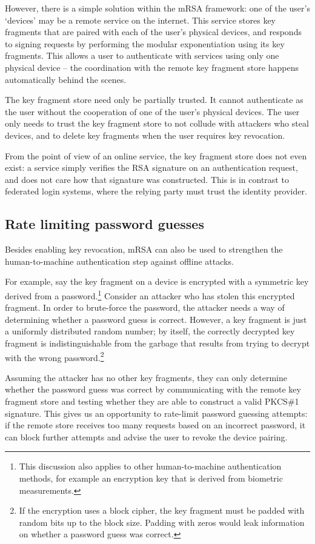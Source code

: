 However, there is a simple solution within the mRSA framework: one of the user's `devices' may be a
remote service on the internet. This service stores key fragments that are paired with each of the
user's physical devices, and responds to signing requests by performing the modular exponentiation
using its key fragments. This allows a user to authenticate with services using only one physical
device -- the coordination with the remote key fragment store happens automatically behind the
scenes.

The key fragment store need only be partially trusted. It cannot authenticate as the user without
the cooperation of one of the user's physical devices. The user only needs to trust the key fragment
store to not collude with attackers who steal devices, and to delete key fragments when the user
requires key revocation.

From the point of view of an online service, the key fragment store does not even exist: a service
simply verifies the RSA signature on an authentication request, and does not care how that signature
was constructed. This is in contrast to federated login systems, where the relying party must trust
the identity provider.

\subsection{Rate limiting password guesses}

Besides enabling key revocation, mRSA can also be used to strengthen the human-to-machine
authentication step against offline attacks.

For example, say the key fragment on a device is encrypted with a symmetric key derived from a
password.\footnote{This discussion also applies to other human-to-machine authentication methods,
for example an encryption key that is derived from biometric measurements.} Consider an attacker who
has stolen this encrypted fragment. In order to brute-force the password, the attacker needs a way
of determining whether a password guess is correct. However, a key fragment is just a uniformly
distributed random number; by itself, the correctly decrypted key fragment is indistinguishable from
the garbage that results from trying to decrypt with the wrong password.\footnote{If the encryption
uses a block cipher, the key fragment must be padded with random bits up to the block size. Padding
with zeros would leak information on whether a password guess was correct.}

Assuming the attacker has no other key fragments, they can only determine whether the password guess
was correct by communicating with the remote key fragment store and testing whether they are able to
construct a valid PKCS\#1 signature. This gives us an opportunity to rate-limit password guessing
attempts: if the remote store receives too many requests based on an incorrect password, it can
block further attempts and advise the user to revoke the device pairing.

